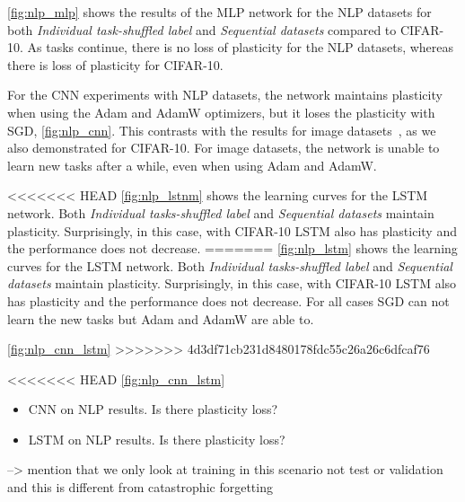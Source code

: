 \autoref{fig:nlp_mlp} shows the results of the MLP network for the NLP datasets for both \textit{Individual task-shuffled label} and \textit{Sequential datasets} compared to CIFAR-10. As tasks continue, there is no loss of plasticity for the NLP datasets, whereas there is loss of plasticity for CIFAR-10.


For the CNN experiments with NLP datasets, the network maintains plasticity when using the Adam and AdamW optimizers, but it loses the plasticity with SGD, \autoref{fig:nlp_cnn}. This contrasts with the results for image datasets~\cite{plasticity papers}, as we also demonstrated for CIFAR-10. For image datasets, the network is unable to learn new tasks after a while, even when using Adam and AdamW.

<<<<<<< HEAD
\autoref{fig:nlp_lstnm} shows the learning curves for the LSTM network. Both \textit{Individual tasks-shuffled label} and \textit{Sequential datasets} maintain plasticity. Surprisingly, in this case, with CIFAR-10 LSTM also has plasticity and the performance does not decrease.
=======
\autoref{fig:nlp_lstm} shows the learning curves for the LSTM network. Both \textit{Individual tasks-shuffled label} and \textit{Sequential datasets} maintain plasticity. Surprisingly, in this case, with CIFAR-10 LSTM also has plasticity and the performance does not decrease. For all cases SGD can not learn the new tasks but Adam and AdamW are able to.

\autoref{fig:nlp_cnn_lstm}
>>>>>>> 4d3df71cb231d8480178fdc55c26a26c6dfcaf76




<<<<<<< HEAD
\autoref{fig:nlp_cnn_lstm}
\begin{itemize}
    \item CNN on NLP results. Is there plasticity loss?
    \item LSTM on NLP results. Is there plasticity loss?
\end{itemize}



--> mention that we only look at training in this scenario not test or validation and this is different from catastrophic forgetting

